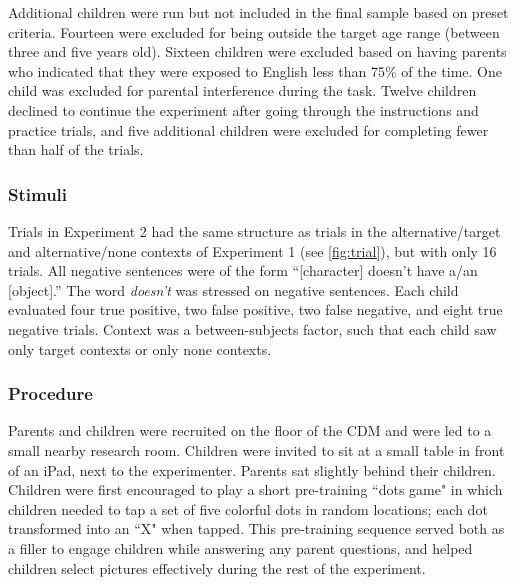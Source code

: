 \documentclass[man, noapacite]{apa2}
\begin{document}
Additional children were run but not included in the final sample based on preset criteria. Fourteen were excluded for being outside the target age range (between three and five years old). Sixteen children were excluded based on having parents who indicated that they were exposed to English less than 75\% of the time. One child was excluded for parental interference during the task. Twelve children declined to continue the experiment after going through the instructions and practice trials, and five additional children were excluded for completing fewer than half of the trials.

\subsubsection{Stimuli}

Trials in Experiment 2 had the same structure as trials in the alternative/target and alternative/none contexts of Experiment 1 (see \ref{fig:trial}), but with only 16 trials. All negative sentences were of the form ``[character] doesn't have a/an [object].'' The word \emph{doesn't} was stressed on negative sentences. Each child evaluated four true positive, two false positive, two false negative, and eight true negative trials. Context was a between-subjects factor, such that each child saw only target contexts or only none contexts.

\subsubsection{Procedure}

Parents and children were recruited on the floor of the CDM and were led to a small nearby research room. Children were invited to sit at a small table in front of an iPad, next to the experimenter. Parents sat slightly behind their children. Children were first encouraged to play a short pre-training ``dots game" in which children needed to tap a set of five colorful dots in random locations; each dot transformed into an ``X" when tapped. This pre-training sequence served both as a filler to engage children while answering any parent questions, and helped children select pictures effectively during the rest of the experiment.
\end{document}
